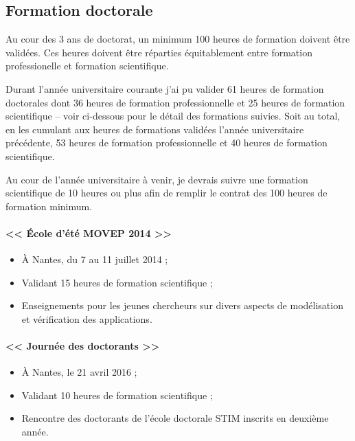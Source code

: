   \subsection{Formation doctorale}

    Au cour des 3 ans de doctorat, un minimum 100 heures de formation doivent
    être validées. Ces heures doivent être réparties équitablement entre
    formation professionelle et formation scientifique.
    
    Durant l'année universitaire courante j'ai pu valider 61 heures de formation
    doctorales dont 36 heures de formation professionnelle et 25 heures de
    formation scientifique -- voir ci-dessous pour le détail des formations
    suivies. Soit au total, en les cumulant aux heures de formations validées
    l'année universitaire précédente, 53 heures de formation professionnelle et
    40 heures de formation scientifique.

    Au cour de l'année universitaire à venir, je devrais suivre une formation
    scientifique de 10 heures ou plus afin de remplir le contrat des 100 heures
    de formation minimum.
  
    \paragraph{<< École d'été MOVEP 2014 >>}
    { \begin{itemize}
        \item À Nantes, du 7 au 11 juillet 2014 ;
        \item Validant 15 heures de formation scientifique ;
        \item Enseignements pour les jeunes chercheurs sur divers aspects de
          modélisation et vérification des applications.
      \end{itemize} }

    \paragraph{<< Journée des doctorants >>}
    { \begin{itemize}
        \item À Nantes, le 21 avril 2016 ;
        \item Validant 10 heures de formation scientifique ;
        \item Rencontre des doctorants de l'école doctorale STIM inscrits en
          deuxième année.
      \end{itemize} }

